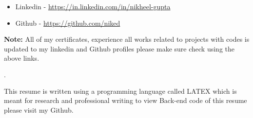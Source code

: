 \documentclass{resume}
\begin{document}
        \begin{itemize}
            \item Linkedin - \href{https://in.linkedin.com/in/nikheel-gupta}{https://in.linkedin.com/in/nikheel-gupta} 
            \item Github -
            \href{https://github.com/niked}{https://github.com/niked}
            \end{itemize}
            \small \noindent\textbf{Note:}
         All of my certificates, experience all works related to projects with codes is updated to my linkedin and Github profiles please make sure check using the above links.


\vfill.
\begin{center}
\footnotesize{This resume is written using a programming language called LATEX which is meant for research and professional writing 
 to view Back-end code of this resume please visit my Github.}
\end{center}
\end{document}

